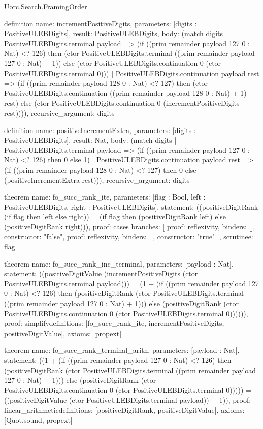 \begin{lexlean}{Uorc.Search.FramingOrder}
\begin{semanticmodule}
definition{
  name: incrementPositiveDigits,
  parameters: [digits : PositiveULEBDigits],
  result: PositiveULEBDigits,
  body: (match digits
    | PositiveULEBDigits.terminal payload => (if ((prim remainder payload 127 0 : Nat) <? 126) then (ctor PositiveULEBDigits.terminal ((prim remainder payload 127 0 : Nat) + 1)) else (ctor PositiveULEBDigits.continuation 0 (ctor PositiveULEBDigits.terminal 0)))
    | PositiveULEBDigits.continuation payload rest => (if ((prim remainder payload 128 0 : Nat) <? 127) then (ctor PositiveULEBDigits.continuation ((prim remainder payload 128 0 : Nat) + 1) rest) else (ctor PositiveULEBDigits.continuation 0 (incrementPositiveDigits rest)))),
  recursive_argument: digits
}

definition{
  name: positiveIncrementExtra,
  parameters: [digits : PositiveULEBDigits],
  result: Nat,
  body: (match digits
    | PositiveULEBDigits.terminal payload => (if ((prim remainder payload 127 0 : Nat) <? 126) then 0 else 1)
    | PositiveULEBDigits.continuation payload rest => (if ((prim remainder payload 128 0 : Nat) <? 127) then 0 else (positiveIncrementExtra rest))),
  recursive_argument: digits
}

theorem{
  name: fo_succ_rank_ite,
  parameters: [flag : Bool, left : PositiveULEBDigits, right : PositiveULEBDigits],
  statement: ((positiveDigitRank (if flag then left else right)) = (if flag then (positiveDigitRank left) else (positiveDigitRank right))),
  proof: cases{
    branches: [
      {proof: reflexivity{}, binders: [], constructor: "false"},
      {proof: reflexivity{}, binders: [], constructor: "true"}
    ],
    scrutinee: flag
  }
}

theorem{
  name: fo_succ_rank_inc_terminal,
  parameters: [payload : Nat],
  statement: ((positiveDigitValue (incrementPositiveDigits (ctor PositiveULEBDigits.terminal payload))) = (1 + (if ((prim remainder payload 127 0 : Nat) <? 126) then (positiveDigitRank (ctor PositiveULEBDigits.terminal ((prim remainder payload 127 0 : Nat) + 1))) else (positiveDigitRank (ctor PositiveULEBDigits.continuation 0 (ctor PositiveULEBDigits.terminal 0)))))),
  proof: simplify{definitions: [fo_succ_rank_ite, incrementPositiveDigits, positiveDigitValue]},
  axioms: [propext]
}

theorem{
  name: fo_succ_rank_terminal_arith,
  parameters: [payload : Nat],
  statement: ((1 + (if ((prim remainder payload 127 0 : Nat) <? 126) then (positiveDigitRank (ctor PositiveULEBDigits.terminal ((prim remainder payload 127 0 : Nat) + 1))) else (positiveDigitRank (ctor PositiveULEBDigits.continuation 0 (ctor PositiveULEBDigits.terminal 0))))) = ((positiveDigitValue (ctor PositiveULEBDigits.terminal payload)) + 1)),
  proof: linear_arithmetic{definitions: [positiveDigitRank, positiveDigitValue]},
  axioms: [Quot.sound, propext]
}


\end{semanticmodule}
\end{lexlean}

